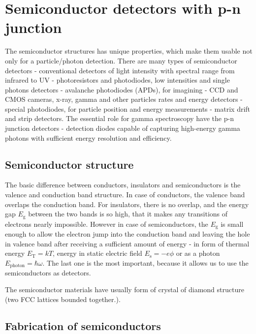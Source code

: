 
\chapter{Semiconductor detectors with p-n junction}
The semiconductor structures has unique properties, which make them usable not only for a particle/photon detection. There are many types of semiconductor detectors - conventional detectors of light intensity with spectral range from infrared to UV - photoresistors and photodiodes, low intensities and single photons detectors - avalanche photodiodes (APDs), for imagining - CCD and CMOS cameras, x-ray, gamma and other particles rates and energy detectors - special photodiodes, for particle position and energy measurements - matrix drift and strip detectors. The essential role for gamma spectroscopy have the p-n junction detectors - detection diodes capable of capturing high-energy gamma photons with sufficient energy resolution and efficiency.
 

\section{Semiconductor structure}
The basic difference between conductors, insulators and semiconductors is the valence and conduction band structure. In case of conductors, the valence band overlaps the conduction band. For insulators, there is no overlap, and the energy gap $E_{\textrm{g}}$ between the two bands is so high, that it makes any transitions of electrons nearly impossible. However in case of  semiconductors, the $E_{\textrm{g}}$ is small enough to allow the electron jump into the conduction band and leaving the hole in valence band after receiving a sufficient amount of energy - in form of thermal energy $E_{\textrm{T}} = kT$, energy in static electric field $E_{\textrm{s}} = -e\phi$ or as a photon $E_{\textrm{photon}} = \hbar \omega$. The last one is the most important, because it allows us to use the semiconductors as detectors.
\par
The semiconductor materials have usually form of crystal of diamond structure (two FCC lattices bounded together.).   
 
 
 
\section{Fabrication of semiconductors}



